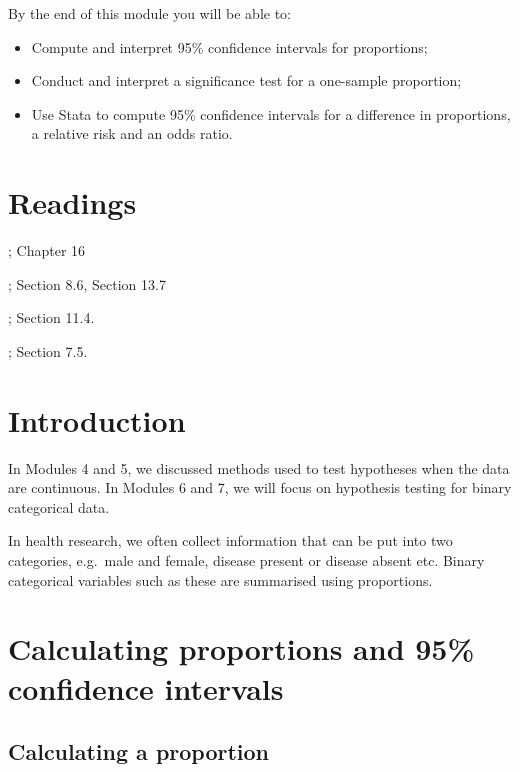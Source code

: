 \documentclass[
]{memoir}
\providecommand{\tightlist}{%
  \setlength{\itemsep}{0pt}\setlength{\parskip}{0pt}}
\begin{document}
By the end of this module you will be able to:

\begin{itemize}
\tightlist
\item
  Compute and interpret 95\% confidence intervals for proportions;
\item
  Conduct and interpret a significance test for a one-sample proportion;
\item
  Use Stata to compute 95\% confidence intervals for a difference in proportions, a relative risk and an odds ratio.
\end{itemize}

\hypertarget{readings-5}{%
\section*{Readings}\label{readings-5}}

\citet{kirkwood_sterne01}; Chapter 16

\citet{bland15}; Section 8.6, Section 13.7

\citet{juul_frydenberg14}; Section 11.4.

\citet{acock10}; Section 7.5.

\hypertarget{introduction-5}{%
\section{Introduction}\label{introduction-5}}

In Modules 4 and 5, we discussed methods used to test hypotheses when the data are continuous. In Modules 6 and 7, we will focus on hypothesis testing for binary categorical data.

In health research, we often collect information that can be put into two categories, e.g.~male and female, disease present or disease absent etc. Binary categorical variables such as these are summarised using proportions.

\hypertarget{calculating-proportions-and-95-confidence-intervals}{%
\section{Calculating proportions and 95\% confidence intervals}\label{calculating-proportions-and-95-confidence-intervals}}

\hypertarget{calculating-a-proportion}{%
\subsection{Calculating a proportion}\label{calculating-a-proportion}}
\end{document}
